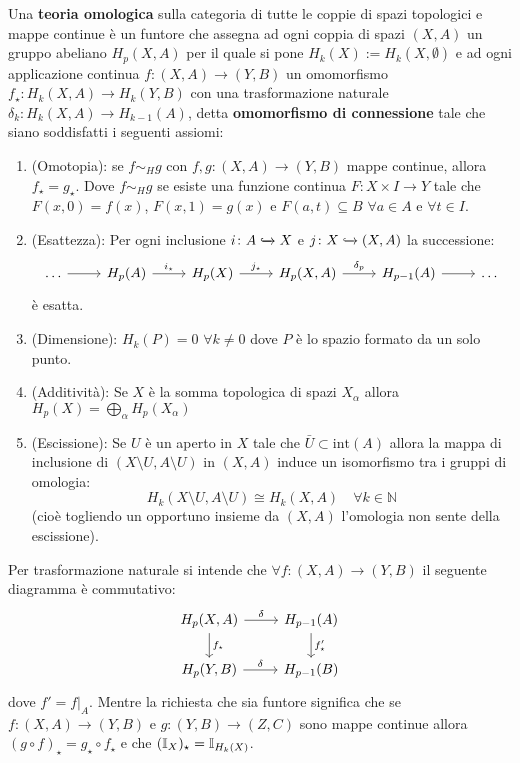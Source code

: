 \begin{definition}
  Una \textbf{teoria omologica}
  sulla categoria di tutte le coppie di spazi topologici e mappe continue è
  un funtore che assegna ad ogni coppia di spazi $ (X, A) $ un gruppo
  abeliano $ H_p(X, A) $ per il quale si pone $ H_k(X) := H_{k}(X, \emptyset) $
  e ad ogni applicazione continua $ f \colon (X, A) \to (Y, B) $
  un omomorfismo $ f_\star \colon H_k(X, A) \to H_k(Y, B) $ con una trasformazione
  naturale $ \delta_k \colon H_k(X, A) \to H_{k-1}(A) $,
  detta \textbf{omomorfismo di connessione}
  tale che siano soddisfatti i seguenti assiomi:
  \begin{enumerate}
  \item (Omotopia): se $ f \sim_H g $ con $ f, g \colon (X, A) \to (Y, B) $ mappe continue, allora $ f_\star = g_\star$.
    Dove $ f \sim_H g $ se esiste una funzione continua $ F \colon X \times I \to Y $ tale che $ F(x,0) = f(x) $,
    $ F(x, 1) = g(x) $ e $ F(a, t) \subseteq B $ $ \forall a \in A $ e $ \forall t \in I $.
  \item (Esattezza): Per ogni inclusione $ i \colon A \xhookrightarrow{} X $ e $ j \colon X \xhookrightarrow{} (X, A) $ la successione:
    \[
      \begin{tikzcd}
        \dots \arrow{r}{}  & H_p(A) \arrow{r}{i_\star} &  H_p(X) \arrow{r}{j_\star} &  H_p(X,A) \arrow{r}{\delta_p} & H_{p-1}(A) \arrow{r}{} & \dots
      \end{tikzcd}
    \]
    è esatta.
  \item (Dimensione): $ H_k (P) = 0 $ $ \forall k \not = 0 $ dove $ P $ è lo spazio formato da un solo punto.
  \item (Additività): Se $ X $ è la somma topologica di spazi $ X_\alpha $ allora $ H_p(X) = \bigoplus_\alpha H_p(X_\alpha) $
  \item (Escissione): Se $ U $ è un aperto in $ X $ tale che $ \bar{U} \subset \mathrm{int}(A) $ allora la mappa di
    inclusione di $ (X \setminus U, A \setminus U) $ in $ (X, A) $ induce un isomorfismo tra i gruppi di omologia:
    \[
      H_k(X \setminus U, A \setminus U) \cong H_k(X, A) \quad \forall k \in \mathbb{N}
    \]
    (cioè togliendo un opportuno insieme da $ (X,A) $ l'omologia non sente della escissione).
  \end{enumerate}
  Per trasformazione naturale si intende che $ \forall f \colon (X, A) \to (Y, B) $ il seguente diagramma è commutativo:
  \[
    \begin{tikzcd}
      H_p(X,A) \arrow{r}{\delta} \arrow{d}{f_\star} & H_{p-1}(A) \arrow{d}{f'_\star} \\
      H_p(Y,B) \arrow{r}{\delta} & H_{p-1}(B)
    \end{tikzcd}
  \]
  dove $ f' = f \big \lvert_A $.
  Mentre la richiesta che sia funtore significa che se $ f \colon (X, A) \to (Y, B) $ e $ g \colon (Y, B) \to (Z, C) $ sono
  mappe continue allora $ (g \circ f)_\star = g_\star \circ f_\star $ e che $ (\mathbb{I}_{X})_\star = \mathbb{I}_{H_k(X)} $.
\end{definition}

